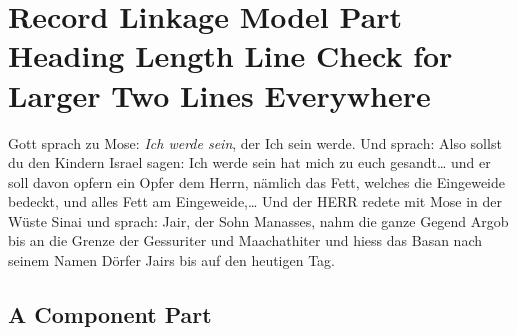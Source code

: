 \section{Record Linkage Model Part Heading Length Line Check for Larger Two Lines Everywhere}\label{sec:reclinkage}
Gott sprach zu Mose:  \emph{Ich werde sein}, der Ich sein werde.
    Und sprach: Also sollst du den Kindern Israel sagen:  Ich werde
    sein \cite{madden2005taq} hat mich zu euch gesandt\ldots
    und er soll davon opfern ein Opfer dem Herrn, n\"amlich das Fett,
    welches die Eingeweide bedeckt, und alles Fett am Eingeweide,\ldots
    Und der HERR redete mit Mose in der W\"uste Sinai und sprach:
    Jair, der Sohn Manasses, nahm die ganze Gegend Argob bis an die
    Grenze der Gessuriter und Maachathiter und hiess das Basan nach
    seinem Namen D\"orfer Jairs bis auf den heutigen Tag.
    




\subsection{A Component Part}
